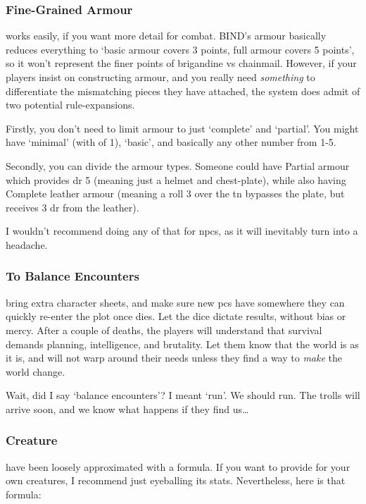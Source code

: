 \begin{multicols}{2}
\subsubsection{Fine-Grained Armour}
works easily, if you want more detail for combat.
BIND's armour basically reduces everything to `basic armour covers 3 points, full armour covers 5 points', so it won't represent the finer points of brigandine vs chainmail.
However, if your players insist on constructing armour, and you really need \emph{something} to differentiate the mismatching pieces they have attached, the system does admit of two potential rule-expansions.

Firstly, you don't need to limit armour to just `complete' and `partial'.
You might have `minimal' (with  of 1), `basic', and basically any other number from 1-5.

Secondly, you can divide the armour types.
Someone could have Partial armour which provides \gls{dr} 5 (meaning just a helmet and chest-plate), while also having Complete leather armour (meaning a roll 3 over the \gls{tn} bypasses the plate, but receives 3 \gls{dr} from the leather).

I wouldn't recommend doing any of that for \glspl{npc}, as it will inevitably turn into a headache.

\subsubsection{To Balance Encounters}
bring extra character sheets, and make sure new \glspl{pc} have somewhere they can quickly re-enter the plot once  dies.
Let the dice dictate results, without bias or mercy.
After a couple of deaths, the players will understand that survival demands planning, intelligence, and brutality.
Let them know that the world is as it is, and will not warp around their needs unless they find a way to \emph{make} the world change.

Wait, did I say `balance encounters'?
I meant `run'.
We should run.
The trolls will arrive soon, and we know what happens if they find us\ldots

\subsubsection{Creature }
have been loosely approximated with a formula.
If you want to provide  for your own creatures, I recommend just eyeballing its stats.
Nevertheless, here is that formula:


\end{multicols}
